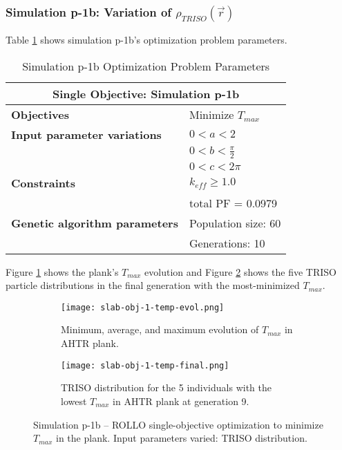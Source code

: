 \subsubsection{Simulation p-1b: Variation of $\rho_{TRISO}(\vec{r})$}
Table \ref{tab:simulationp1b} shows simulation p-1b's optimization problem parameters. 
\begin{table}[htbp]
    \centering
    \onehalfspacing
    \caption{Simulation p-1b Optimization Problem Parameters}
	\label{tab:simulationp1b}
    \footnotesize
    \begin{tabular}{l|p{3cm}}
    \hline 
    \multicolumn{2}{c}{\textbf{Single Objective: Simulation p-1b}} \\
    \hline 
    \textbf{Objectives} & Minimize $T_{max}$ \\
    \hline 
    \textbf{Input parameter variations} & $0<a<2$ \\
    & $0<b<\frac{\pi}{2}$ \\
    & $0<c<2\pi$ \\
    \hline
    \textbf{Constraints} & $k_{eff} \geq 1.0$\\ 
    & total PF = 0.0979\\
    \hline 
    \textbf{Genetic algorithm parameters} & Population size: 60 \\
    & Generations: 10 \\
    \hline
    \end{tabular}
\end{table}
Figure \ref{fig:slab-obj-1-temp-evol} shows the plank's $T_{max}$ evolution 
and Figure \ref{fig:slab-obj-1-temp-final} shows the five TRISO particle 
distributions in the final generation with the most-minimized $T_{max}$.
\begin{figure}[htbp]
    \centering
    \begin{subfigure}{\textwidth}
        \texttt{[image: slab-obj-1-temp-evol.png]}
        \caption{Minimum, average, and maximum evolution of $T_{max}$ in 
        AHTR plank.}
        \label{fig:slab-obj-1-temp-evol} 
    \end{subfigure}
    \begin{subfigure}{\textwidth}
        \texttt{[image: slab-obj-1-temp-final.png]}
        \caption{TRISO distribution for the 5 individuals with the 
        lowest $T_{max}$ in AHTR plank at generation 9.}
        \label{fig:slab-obj-1-temp-final} 
    \end{subfigure}
    \caption{Simulation p-1b -- ROLLO single-objective optimization to minimize $T_{max}$ 
    in the plank. Input parameters varied: TRISO distribution.}
    \label{fig:slab-obj-1-temp}
\end{figure}

